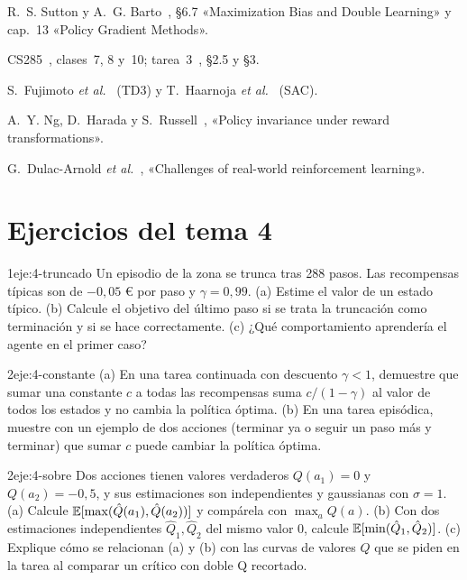 \begin{lecturas}
\item R.~S. Sutton y A.~G. Barto~\cite{sb}, §6.7 «Maximization Bias and Double Learning» y cap.~13 «Policy Gradient Methods».
\item CS285~\cite{cs285}, clases~7, 8 y~10; tarea~3~\cite{cs285hw3}, §2.5 y §3.
\item S.~Fujimoto \emph{et al.}~\cite{td3} (TD3) y T.~Haarnoja \emph{et al.}~\cite{sac,sac2} (SAC).
\item A.~Y. Ng, D.~Harada y S.~Russell~\cite{ng}, «Policy invariance under reward transformations».
\item G.~Dulac-Arnold \emph{et al.}~\cite{dulac}, «Challenges of real-world reinforcement learning».
\end{lecturas}

\section*{Ejercicios del tema 4}

\begin{ejercicio}{1}{eje:4-truncado}
Un episodio de la zona se trunca tras 288 pasos. Las recompensas típicas son de $-0{,}05$ € por paso y $\gamma=0{,}99$. (a) Estime el valor de un estado típico. (b) Calcule el objetivo del último paso si se trata la truncación como terminación y si se hace correctamente. (c) ¿Qué comportamiento aprendería el agente en el primer caso?
\end{ejercicio}

\begin{ejercicio}{2}{eje:4-constante}
(a) En una tarea continuada con descuento $\gamma<1$, demuestre que sumar una constante $c$ a todas las recompensas suma $c/(1-\gamma)$ al valor de todos los estados y no cambia la política óptima. (b) En una tarea episódica, muestre con un ejemplo de dos acciones (terminar ya o seguir un paso más y terminar) que sumar $c$ puede cambiar la política óptima.
\end{ejercicio}

\begin{ejercicio}{2}{eje:4-sobre}
Dos acciones tienen valores verdaderos $Q(a_1)=0$ y $Q(a_2)=-0{,}5$, y sus estimaciones son independientes y gaussianas con $\sigma=1$. (a) Calcule $\mathbb{E}[\max(\hat Q(a_1),\hat Q(a_2))]$ y compárela con $\max_aQ(a)$. (b) Con dos estimaciones independientes $\hat Q_1,\hat Q_2$ del mismo valor $0$, calcule $\mathbb{E}[\min(\hat Q_1,\hat Q_2)]$. (c) Explique cómo se relacionan (a) y (b) con las curvas de valores $Q$ que se piden en la tarea al comparar un crítico con doble Q recortado.
\end{ejercicio}

